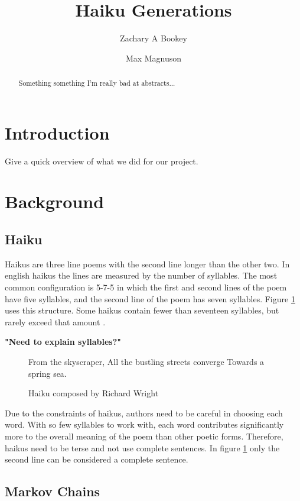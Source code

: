 \documentclass[]{article}
\title{Haiku Generations}
\author{Zachary A Bookey \and Max Magnuson}
\newcommand{\comment}[1]
{\par {\bfseries \color{green} #1 \par}}
\begin{document}
\maketitle

\begin{abstract}
Something something I'm really bad at abstracts...
\end{abstract}

\section{Introduction}
Give a quick overview of what we did for our project.

\section{Background}

\subsection{Haiku}
Haikus are three line poems with the second line longer than the other two. In english haikus the lines are measured by the number of syllables. The most common configuration is 5-7-5 in which the first and second lines of the poem have five syllables, and the second line of the poem has seven syllables. Figure \ref{fig:WrightHaiku} uses this structure. Some haikus contain fewer than seventeen syllables, but rarely exceed that amount \cite{Higginson}. \comment{"Need to explain syllables?"}

\begin{figure}[H]
	\centering
	From the skyscraper, \break
	All the bustling streets converge \break
	Towards a spring sea.
	\caption{Haiku composed by Richard Wright \cite{Terebess}}
	\label{fig:WrightHaiku}
\end{figure}

Due to the constraints of haikus, authors need to be careful in choosing each word. With so few syllables to work with, each word contributes significantly more to the overall meaning of the poem than other poetic forms. Therefore, haikus need to be terse and not use complete sentences. In figure \ref{fig:WrightHaiku} only the second line can be considered a complete sentence.

\subsection{Markov Chains}
\end{document}
